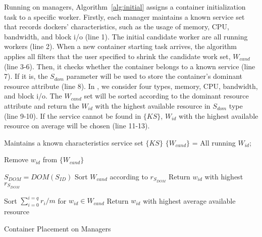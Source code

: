 Running on managers, Algorithm~\ref{alg:initial} assigns a container initialization task to a specific worker.
Firstly, each manager maintains a known service set that records dockers' characteristics, such as the usage of memory, CPU, bandwidth, and block i/o (line 1).
The initial candidate worker are all running workers (line 2).
When a new container starting task arrives, the algorithm applies all filters that the user specified to shrink the candidate work set, $W_{cand}$ (line 3-6).
Then, it checks whether the container belongs to a known service (line 7). If it is, the $S_{dom}$ parameter will be used to store the container's dominant
resource attribute (line 8). In \sol, we consider four types, memory, CPU, bandwidth, and block i/o.
The $W_{cand}$ set will be sorted according to the dominant resource attribute and
return the $W_{id}$ with the highest available resource in $S_{dom}$ type (line 9-10).
If the service cannot be found in $\{KS\}$, $W_{id}$ with the highest available resource on average will be chosen (line 11-13).

\begin{algorithm}[ht]
\begin{algorithmic}[1]
\STATE Maintains a known characteristics service set $\{KS\}$
\STATE $\{W_{cand}\}$ = All running $W_{id}$;

\STATE Remove $w_{id}$ from $\{W_{cand}\}$
\ENDIF
\ENDFOR

\STATE $S_{DOM} =  DOM(S_{ID})$
\STATE Sort $W_{cand}$ according to $r_{S_{DOM}}$
\STATE Return $w_{id}$ with highest $r_{S_{DOM}}$

\begin{comment}
  \IF {$S_{dom} = ``M''$}
  \STATE Sort $\{W_{cand}\}$ according to $W_{mem}$
  \STATE Return $W_{id}$ with highest $W_{mem}$

  \ELSIF {$S_{DOM} = ``C''$}
  \STATE Sort $\{W_{cand}\}$ according to $W_{cpu}$
  \STATE Return $W_{id}$ with highest $W_{cpu}$

  \ELSIF {$S_{dom} = ``N''$}
  \STATE Sort $\{W_{cand}\}$ according to $W_{net}$
  \STATE Return $W_{id}$ with highest $W_{net}$

  \ELSIF {$S_{dom} = ``IO''$}
  \STATE Sort $\{W_{cand}\}$ according to $W_{io}$
  \STATE Return $W_{id}$ with highest $W_{io}$
  \ENDIF
\end{comment}

  \ELSE
  \STATE Sort $\sum_{i=0}^{i=q} r_i / m$ for $w_{id} \in W_{cand}$
  \STATE Return $w_{id}$ with highest average available resource

\ENDIF

\end{algorithmic}
\caption{Container Placement on Managers}
\label{alg:initial}
\end{algorithm}



